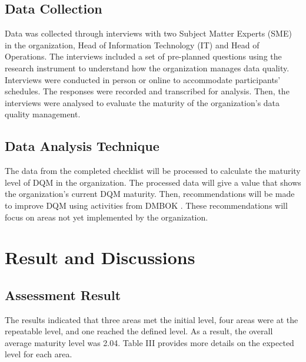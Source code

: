 \documentclass[conference]{IEEEtran}
\begin{document}
\subsection{Data Collection}
Data was collected through interviews with two Subject Matter Experts (SME) in the organization, Head of Information Technology (IT) and Head of Operations. The interviews included a set of pre-planned questions using the research instrument to understand how the organization manages data quality. Interviews were conducted in person or online to accommodate participants’ schedules. The responses were recorded and transcribed for analysis. Then, the interviews were analysed to evaluate the maturity of the organization’s data quality management.  
\subsection{Data Analysis Technique}
The data from the completed checklist will be processed to calculate the maturity level of DQM in the organization. The processed data will give a value that shows the organization's current DQM maturity. Then, recommendations will be made to improve DQM using activities from DMBOK \cite{DAMA_2013}. These recommendations will focus on areas not yet implemented by the organization.

\section{Result and Discussions}
\subsection{Assessment Result}
The results indicated that three areas met the initial level, four areas were at the repeatable level, and one reached the defined level. As a result, the overall average maturity level was 2.04. Table III provides more details on the expected level for each area.
\end{document}
